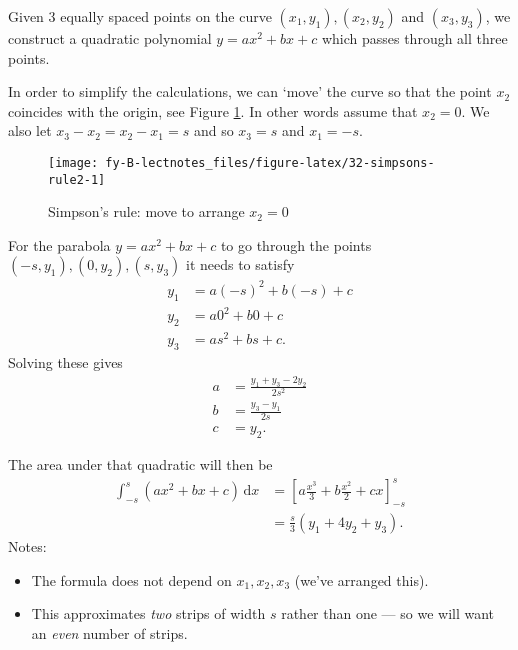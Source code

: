 \documentclass[
  11pt,
  oneside]{book}
\providecommand{\tightlist}{%
  \setlength{\itemsep}{0pt}\setlength{\parskip}{0pt}}
\newcommand{\slide}{}
\theoremstyle{definition}
\theoremstyle{definition}
\theoremstyle{definition}
\theoremstyle{definition}
\theoremstyle{remark}
\begin{document}
\slide

Given 3 equally spaced points on the curve \((x_1,y_1), (x_2, y_2)\) and \((x_3,y_3)\), we construct a quadratic polynomial \(y=ax^2+bx+c\) which passes through all three points.

In order to simplify the calculations, we can `move' the curve so that the point \(x_2\) coincides with the origin, see Figure \ref{fig:32-simpsons-rule2}. In other words assume that \(x_2=0\). We also let \(x_3-x_2=x_2-x_1=s\) and so \(x_3=s\) and \(x_1=-s\).

\begin{figure}

{\centering \texttt{[image: fy-B-lectnotes\_files/figure-latex/32-simpsons-rule2-1]} 

}

\caption{Simpson's rule: move to arrange $x_2=0$}\label{fig:32-simpsons-rule2}
\end{figure}

\slide

For the parabola \(y=ax^2+bx+c\) to go through the points \((-s,y_1),(0,y_2),(s,y_3)\) it needs to satisfy
\begin{align*}
y_1&=a(-s)^2+b(-s)+c\\
y_2&=a0^2+b0+c\\
y_3&=as^2+bs+c.
\end{align*}
Solving these gives
\begin{align*}
a&=\frac{y_1+y_3-2y_2}{2s^2}\\
b&=\frac{y_3-y_1}{2s}\\
c&=y_2.
\end{align*}
\slide
The area under that quadratic will then be
\begin{align*}
\int_{-s}^{s}(ax^2+bx+c)\,\mathrm{d}x &= \left[a\frac{x^3}3+b\frac{x^2}2+cx\right]_{-s}^{s}\\
&=\frac{s}{3}\left(y_1+4y_2+y_3\right).
\end{align*}
Notes:

\begin{itemize}
\tightlist
\item
  The formula does not depend on \(x_1,x_2,x_3\) (we've arranged this).
\item
  This approximates \emph{two} strips of width \(s\) rather than one --- so we will want an \emph{even} number of strips.
\end{itemize}

\slide
\end{document}
